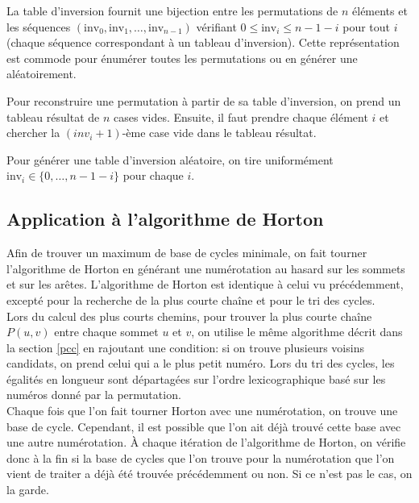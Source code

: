 \documentclass{article}
\begin{document}
La table d'inversion fournit une bijection entre les permutations de $n$ éléments et les séquences $(\text{inv}_0, \text{inv}_1, \ldots, \text{inv}_{n-1})$ vérifiant $0 \leq \text{inv}_i \leq n-1-i$ pour tout $i$ (chaque séquence correspondant à un tableau d'inversion). Cette représentation est commode pour énumérer toutes les permutations ou en générer une aléatoirement.

Pour reconstruire une permutation à partir de sa table d'inversion, on prend un tableau résultat de $n$ cases vides. Ensuite, il faut prendre chaque élément $i$ et chercher la  $(inv_i+1)$-ème case vide dans le tableau résultat.

Pour générer une table d'inversion aléatoire, on tire uniformément $\text{inv}_i \in \{0, \ldots, n-1-i\}$ pour chaque $i$.

\subsection{Application à l'algorithme de Horton}

Afin de trouver un maximum de base de cycles minimale, on fait tourner l'algorithme de Horton en générant une numérotation au hasard sur les sommets et sur les arêtes. L'algorithme de Horton est identique à celui vu précédemment, excepté pour la recherche de la plus courte chaîne et pour le tri des cycles. \\
Lors du calcul des plus courts chemins, pour trouver la plus courte chaîne $P(u,v)$ entre chaque sommet $u$ et $v$, on utilise le même algorithme décrit dans la section \ref{pcc} en rajoutant une condition: si on trouve plusieurs voisins candidats, on prend celui qui a le plus petit numéro.
Lors du tri des cycles, les égalités en longueur sont départagées sur l'ordre lexicographique basé sur les numéros donné par la permutation. \\
Chaque fois que l'on fait tourner Horton avec une numérotation, on trouve une base de cycle. Cependant, il est possible que l'on ait déjà trouvé cette base avec une autre numérotation. À chaque itération de l'algorithme de Horton, on vérifie donc à la fin si la base de cycles que l'on trouve pour la numérotation que l'on vient de traiter a déjà été trouvée précédemment ou non. Si ce n'est pas le cas, on la garde.
\end{document}
